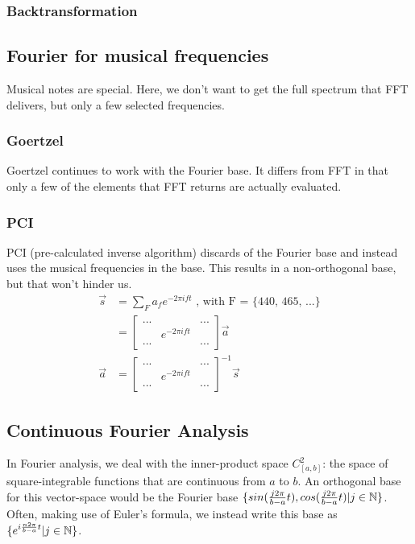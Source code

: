 \subsubsection{Backtransformation}

\subsection{Fourier for musical frequencies}
Musical notes are special. Here, we don't want to get the full spectrum that FFT delivers, but only a few selected frequencies. 
\subsubsection{Goertzel}
Goertzel continues to work with the Fourier base. It differs from FFT in that only a few of the elements that FFT returns are actually evaluated. 
\subsubsection{PCI}
PCI (pre-calculated inverse algorithm) discards of the Fourier base and instead uses the musical frequencies in the base.
This results in a non-orthogonal base, but that won't hinder us. 
\begin{equation}
    \begin{split}
        \vec{s} &= \sum_F a_f e^{-2 \pi i f t} \text{  , with F = \{440, 465, ...\}}  \\
                &= \begin{bmatrix}  ... & & ... \\ & e^{- 2 \pi i f t} & \\ ... &  & ... \end{bmatrix} \vec{a} \\
        \vec{a} &= \begin{bmatrix}  ... & & ... \\ & e^{- 2 \pi i f t} & \\ ... &  & ... \end{bmatrix}^{-1} \vec{s}
    \end{split}
\end{equation}

\subsection{Continuous Fourier Analysis}

In Fourier analysis, we deal with the inner-product space $C_{[a,b]}^2$:
the space of square-integrable functions that are continuous from $a$ to $b$.
An orthogonal base for this vector-space would be the Fourier base $\{ sin(\frac{j 2 \pi}{b-a} t), cos(\frac{j 2 \pi}{b-a}  t) | j \in \mathbb{N} \}$.
Often, making use of Euler's formula, we instead write this base as $\{ e^{i \frac{n 2 \pi}{b-a} t} | j \in \mathbb{N} \}$. 

